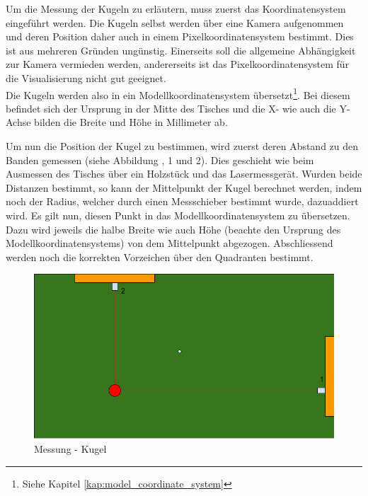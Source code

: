 Um die Messung der Kugeln zu erläutern, muss zuerst das Koordinatensystem eingeführt werden. Die Kugeln selbst werden
über eine Kamera aufgenommen und deren Position daher auch in einem Pixelkoordinatensystem bestimmt. Dies ist aus
mehreren Gründen ungünstig. Einerseits soll die allgemeine Abhängigkeit zur Kamera vermieden werden, andererseits ist das
Pixelkoordinatensystem für die Visualisierung nicht gut geeignet.\\
Die Kugeln werden also in ein Modellkoordinatensystem übersetzt\footnote{Siehe Kapitel \ref{kap:model_coordinate_system}}.
Bei diesem befindet sich der Ursprung in der Mitte des Tisches und die X- wie auch die Y-Achse bilden die Breite und Höhe
in Millimeter ab.

Um nun die Position der Kugel zu bestimmen, wird zuerst deren Abstand zu den Banden gemessen (siehe Abbildung \label{fig:messung:kugel}, 1 und 2).
Dies geschieht wie beim Ausmessen des Tisches über ein Holzstück und das Lasermessgerät. Wurden beide Distanzen bestimmt, so
kann der Mittelpunkt der Kugel berechnet werden, indem noch der Radius, welcher durch einen Messschieber bestimmt wurde, dazuaddiert wird.
Es gilt nun, diesen Punkt in das Modellkoordinatensystem zu übersetzen. Dazu wird jeweils die halbe Breite wie auch Höhe
(beachte den Ursprung des Modellkoordinatensystems) von dem Mittelpunkt abgezogen. Abschliessend werden noch die korrekten
Vorzeichen über den Quadranten bestimmt.

\begin{figure}[h!]
    \begin{center}
        \includegraphics[width=0.8\linewidth]{../common/03_billiard_ai/resources/02_messung_kugel.png}
    \end{center}
    \caption{Messung - Kugel}
    \label{fig:messung:kugel}
\end{figure}


